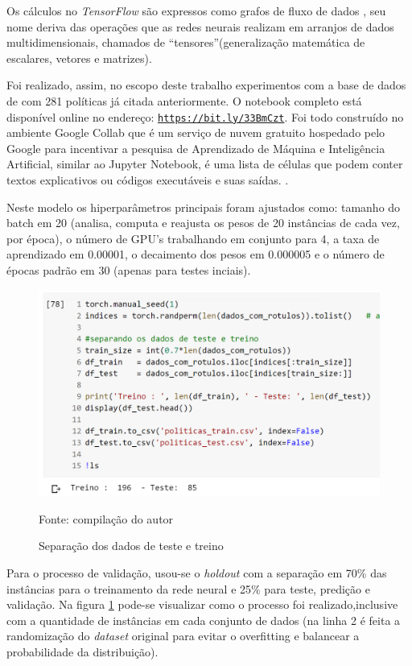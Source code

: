 Os cálculos no \textit{TensorFlow} são expressos como grafos de fluxo de dados , seu nome deriva das operações que as redes neurais realizam em arranjos de dados multidimensionais, chamados de ``tensores''(generalização matemática de escalares, vetores e matrizes). \cite{kadimisetty_tensorflow_2018}

Foi realizado, assim, no escopo deste trabalho experimentos com a base de dados de com 281 políticas já citada anteriormente. O notebook completo está disponível online no endereço: \underline{\texttt{https://bit.ly/33BmCzt}}. Foi todo construído no ambiente Google Collab que é um serviço de nuvem gratuito hospedado pelo Google para incentivar a pesquisa de Aprendizado de Máquina e Inteligência Artificial, similar ao Jupyter Notebook, é uma lista de células que podem conter textos explicativos ou códigos executáveis e suas saídas. \cite{collab_2020}.

Neste modelo os hiperparâmetros principais foram ajustados como: tamanho do batch em 20 (analisa, computa e reajusta os pesos de 20 instâncias de cada vez, por época), o número de GPU's trabalhando em conjunto para 4, a taxa de aprendizado em 0.00001, o decaimento dos pesos em 0.000005 e o número de épocas padrão em 30 (apenas para testes inciais).

\begin{figure}[h!]
	\centering
	\includegraphics[width=.6\textwidth]{imagens/separacao-teste-treino.png}
	\caption{Separação dos dados de teste e treino}
	\label{fig:separacao-teste-treino}
	{\scriptsize Fonte: compilação do autor}
\end{figure}

Para o processo de validação, usou-se o \textit{holdout} com a separação em 70\% das instâncias para o treinamento da rede neural e 25\% para teste, predição e validação. Na figura \ref{fig:separacao-teste-treino} pode-se visualizar como o processo foi realizado,inclusive com a quantidade de instâncias em cada conjunto de dados (na linha 2 é feita a randomização do \textit{dataset} original para evitar o overfitting e balancear a probabilidade da distribuição).

